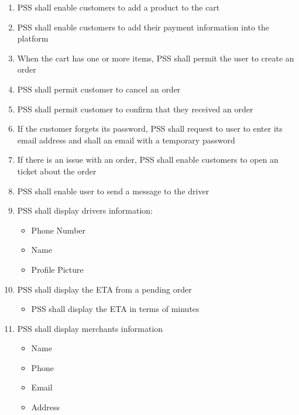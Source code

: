     \pagebreak
    \begin{enumerate}[resume, label=SY-\arabic*]
    \item PSS shall enable customers to add a product to the cart
    \item PSS shall enable customers to add their payment information 
    into the platform
    \item When the cart has one or more items, PSS shall permit the user to 
    create an order
    \item PSS shall permit customer to cancel an order
    \item PSS shall permit customer to confirm that they received an order
    \item If the customer forgets its password, PSS shall request to user to 
    enter its email address and shall an email with a temporary password
    \item If there is an issue with an order, PSS shall enable customers to 
    open an ticket about the order
    \item PSS shall enable user to send a message to the driver
    \item PSS shall display drivers information:
    \begin{itemize}
        \item Phone Number
        \item Name
        \item Profile Picture
    \end{itemize}
    \item PSS shall display the ETA from a pending order
    \begin{itemize}
        \item PSS shall display the ETA in terms of minutes
    \end{itemize}
    \item PSS shall display merchants information
    \begin{itemize}
        \item Name
        \item Phone 
        \item Email 
        \item Address
    \end{itemize}
\end{enumerate}
\pagebreak

